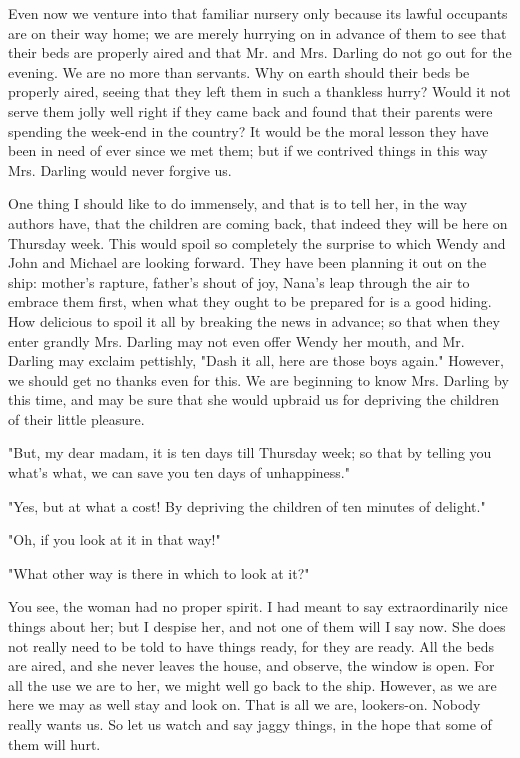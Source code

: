 Even now we venture into that familiar nursery only because its lawful
occupants are on their way home; we are merely hurrying on in advance of
them to see that their beds are properly aired and that Mr. and Mrs.
Darling do not go out for the evening. We are no more than servants. Why
on earth should their beds be properly aired, seeing that they left them
in such a thankless hurry? Would it not serve them jolly well right if
they came back and found that their parents were spending the week-end in
the country? It would be the moral lesson they have been in need of ever
since we met them; but if we contrived things in this way Mrs. Darling
would never forgive us.


One thing I should like to do immensely, and that is to tell her, in the
way authors have, that the children are coming back, that indeed they will
be here on Thursday week. This would spoil so completely the surprise to
which Wendy and John and Michael are looking forward. They have been
planning it out on the ship: mother's rapture, father's shout of joy,
Nana's leap through the air to embrace them first, when what they ought to
be prepared for is a good hiding. How delicious to spoil it all by
breaking the news in advance; so that when they enter grandly Mrs. Darling
may not even offer Wendy her mouth, and Mr. Darling may exclaim pettishly,
"Dash it all, here are those boys again." However, we should get no thanks
even for this. We are beginning to know Mrs. Darling by this time, and may
be sure that she would upbraid us for depriving the children of their
little pleasure.


"But, my dear madam, it is ten days till Thursday week; so that by telling
you what's what, we can save you ten days of unhappiness."


"Yes, but at what a cost! By depriving the children of ten minutes of
delight."


"Oh, if you look at it in that way!"


"What other way is there in which to look at it?"


You see, the woman had no proper spirit. I had meant to say
extraordinarily nice things about her; but I despise her, and not one of
them will I say now. She does not really need to be told to have things
ready, for they are ready. All the beds are aired, and she never leaves
the house, and observe, the window is open. For all the use we are to her,
we might well go back to the ship. However, as we are here we may as well
stay and look on. That is all we are, lookers-on. Nobody really wants us.
So let us watch and say jaggy things, in the hope that some of them will
hurt.


